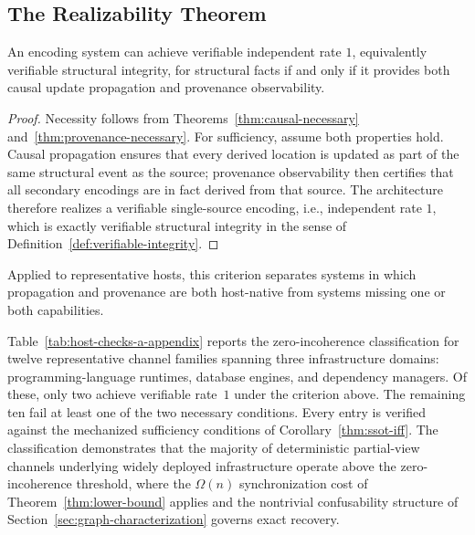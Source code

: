 \subsection{The Realizability Theorem}\label{sec:realizability-theorem}

\begin{corollary}\label{thm:ssot-iff}
An encoding system can achieve verifiable independent rate $1$, equivalently verifiable structural integrity, for structural facts if and only if it provides both causal update propagation and provenance observability.
\end{corollary}

\begin{proof}
Necessity follows from Theorems~\ref{thm:causal-necessary} and~\ref{thm:provenance-necessary}. For sufficiency, assume both properties hold. Causal propagation ensures that every derived location is updated as part of the same structural event as the source; provenance observability then certifies that all secondary encodings are in fact derived from that source. The architecture therefore realizes a verifiable single-source encoding, i.e., independent rate $1$, which is exactly verifiable structural integrity in the sense of Definition~\ref{def:verifiable-integrity}.
\end{proof}

Applied to representative hosts, this criterion separates systems in which propagation and provenance are both host-native from systems missing one or both capabilities.

Table~\ref{tab:host-checks-a-appendix} reports the zero-incoherence classification for twelve representative channel families spanning three infrastructure domains: programming-language runtimes, database engines, and dependency managers. Of these, only two achieve verifiable rate~$1$ under the criterion above. The remaining ten fail at least one of the two necessary conditions. Every entry is verified against the mechanized sufficiency conditions of Corollary~\ref{thm:ssot-iff}. The classification demonstrates that the majority of deterministic partial-view channels underlying widely deployed infrastructure operate above the zero-incoherence threshold, where the $\Omega(n)$ synchronization cost of Theorem~\ref{thm:lower-bound} applies and the nontrivial confusability structure of Section~\ref{sec:graph-characterization} governs exact recovery.

